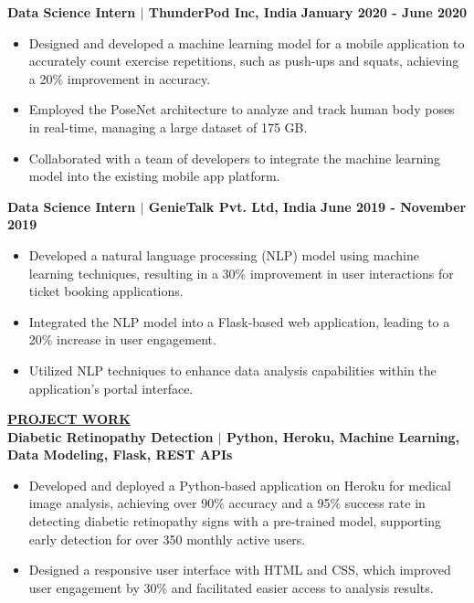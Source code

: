 \documentclass{article}
\begin{document}
\vspace{2mm} 

\noindent \textbf{Data Science Intern $\mid$ ThunderPod Inc, India}  \hfill \textbf{January 2020 - June 2020}
\begin{itemize}[noitemsep,nolistsep,leftmargin=*]
\item {\small Designed and developed a machine learning model for a mobile application to accurately count exercise repetitions, such as push-ups and squats, achieving a 20\% improvement in accuracy.}
\item {\small Employed the PoseNet architecture to analyze and track human body poses in real-time, managing a large dataset of 175 GB.}
\item {\small Collaborated with a team of developers to integrate the machine learning model into the existing mobile app platform.}
\end{itemize}

\vspace{2mm} 

\noindent \textbf{Data Science Intern $\mid$ GenieTalk Pvt. Ltd, India}  \hfill \textbf{June 2019 - November 2019}
\begin{itemize}[noitemsep,nolistsep,leftmargin=*]
\item {\small Developed a natural language processing (NLP) model using machine learning techniques, resulting in a 30\% improvement in user interactions for ticket booking applications.}
\item {\small Integrated the NLP model into a Flask-based web application, leading to a 20\% increase in user engagement.}
\item {\small Utilized NLP techniques to enhance data analysis capabilities within the application's portal interface.}\\
\end{itemize}

\noindent \textbf{\underline{PROJECT WORK}} \\
\noindent \textbf{Diabetic Retinopathy Detection $\mid$ {\small Python, Heroku, Machine Learning, Data Modeling, Flask, REST APIs}}
\begin{itemize}[noitemsep,nolistsep,leftmargin=*]
\item {\small Developed and deployed a Python-based application on Heroku for medical image analysis, achieving over 90\% accuracy and a 95\% success rate in detecting diabetic retinopathy signs with a pre-trained model, supporting early detection for over 350 monthly active users.}
\item {\small Designed a responsive user interface with HTML and CSS, which improved user engagement by 30\% and facilitated easier access to analysis results.}\\
\end{itemize}
\end{document}
